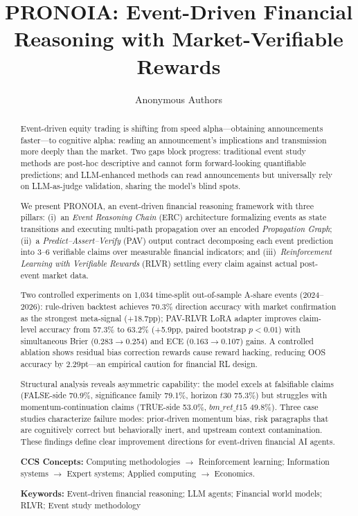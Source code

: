 \documentclass[sigconf, anonymous, review]{acmart}
\begin{document}
\title{PRONOIA: Event-Driven Financial Reasoning with Market-Verifiable Rewards}

\author{Anonymous Authors}

\renewcommand{\shortauthors}{Anonymous}

\begin{abstract}
Event-driven equity trading is shifting from speed alpha---obtaining announcements faster---to cognitive alpha: reading an announcement's implications and transmission more deeply than the market. Two gaps block progress: traditional event study methods are post-hoc descriptive and cannot form forward-looking quantifiable predictions; and LLM-enhanced methods can read announcements but universally rely on LLM-as-judge validation, sharing the model's blind spots.

We present PRONOIA, an event-driven financial reasoning framework with three pillars: (i)~an \emph{Event Reasoning Chain} (ERC) architecture formalizing events as state transitions and executing multi-path propagation over an encoded \emph{Propagation Graph}; (ii)~a \emph{Predict--Assert--Verify} (PAV) output contract decomposing each event prediction into 3--6 verifiable claims over measurable financial indicators; and (iii)~\emph{Reinforcement Learning with Verifiable Rewards} (RLVR) settling every claim against actual post-event market data.

Two controlled experiments on 1,034 time-split out-of-sample A-share events (2024--2026): rule-driven backtest achieves 70.3\% direction accuracy with market confirmation as the strongest meta-signal (+18.7pp); PAV-RLVR LoRA adapter improves claim-level accuracy from 57.3\% to 63.2\% (+5.9pp, paired bootstrap $p<0.01$) with simultaneous Brier (0.283$\to$0.254) and ECE (0.163$\to$0.107) gains. A controlled ablation shows residual bias correction rewards cause reward hacking, reducing OOS accuracy by 2.29pt---an empirical caution for financial RL design.

Structural analysis reveals asymmetric capability: the model excels at falsifiable claims (FALSE-side 70.9\%, significance family 79.1\%, horizon $t30$ 75.3\%) but struggles with momentum-continuation claims (TRUE-side 53.0\%, $bm\_ret\_t15$ 49.8\%). Three case studies characterize failure modes: prior-driven momentum bias, risk paragraphs that are cognitively correct but behaviorally inert, and upstream context contamination. These findings define clear improvement directions for event-driven financial AI agents.

\textbf{CCS Concepts:} Computing methodologies $\to$ Reinforcement learning; Information systems $\to$ Expert systems; Applied computing $\to$ Economics.

\textbf{Keywords:} Event-driven financial reasoning; LLM agents; Financial world models; RLVR; Event study methodology
\end{abstract}
\end{document}
